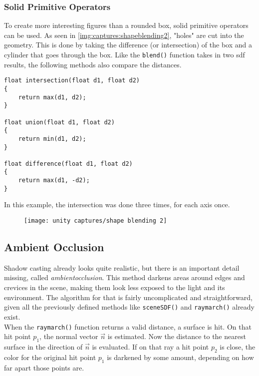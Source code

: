 \clearpage
\subsubsection{Solid Primitive Operators}
To create more interesting figures than a rounded box, solid primitive operators can be used. As seen in \autoref{img:captures:shapeblending2}, "holes" are cut into the geometry. This is done by taking the difference (or intersection) of the box and a cylinder that goes through the box.
Like the \lstinline[language=HLSL]{blend()} function takes in two \gls{sdf} results, the following methods also compare the distances.

\begin{lstlisting}[language=HLSL, caption=Implementation of solid primitive operations., label=lst:shader:shapeblending:primitiveoperations]
float intersection(float d1, float d2)
{
    return max(d1, d2);
}

float union(float d1, float d2)
{
    return min(d1, d2);
}

float difference(float d1, float d2)
{
    return max(d1, -d2);
}
\end{lstlisting}

\noindent
In this example, the intersection was done three times, for each axis once.

\begin{figure}[H]
    \texttt{[image: unity captures/shape blending 2]}
    \label{img:captures:shapeblending2}
\end{figure}

\clearpage
\subsection{Ambient Occlusion}
Shadow casting already looks quite realistic, but there is an important detail missing, called \textit{\gls{ambientocclusion}}. This method darkens areas around edges and crevices in the scene, making them look less exposed to the light and its environment.
The algorithm for that is fairly uncomplicated and straightforward, given all the previously defined methods like \lstinline[language=HLSL]{sceneSDF()} and \lstinline[language=HLSL]{raymarch()} already exist.
\\
When the \lstinline[language=HLSL]{raymarch()} function returns a valid distance, a surface is hit. On that hit point $p_1$, the normal vector $\overrightarrow{n}$ is estimated. Now the distance to the nearest surface in the direction of $\overrightarrow{n}$ is evaluated.
If on that ray a hit point $p_2$ is close, the color for the original hit point $p_1$ is darkened by some amount, depending on how far apart those points are.

